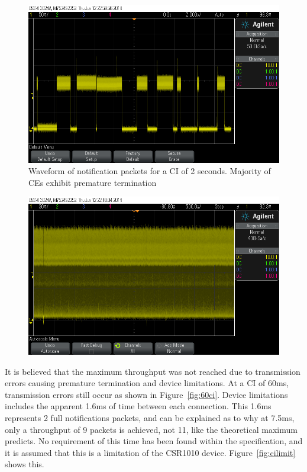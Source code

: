 \documentclass[]{article}
\begin{document}
\begin{figure}[H]
	\begin{center}
		\includegraphics[width = \textwidth]{2sec}
	\end{center}
	\caption{Waveform of notification packets for a \ac{CI} of 2 seconds. Majority of \ac{CE}s exhibit premature termination}
	\label{fig:2sec}
\end{figure}


\begin{figure}[H]
	\begin{center}
		\includegraphics[width = \textwidth]{lowcierrors}
	\end{center}
	\caption{}
	\label{fig:lowcierrors}
\end{figure}



It is believed that the maximum throughput was not reached due to transmission errors causing premature termination and device limitations. At a \ac{CI} of 60ms, transmission errors still occur as shown in Figure~\ref{fig:60ci}. Device limitations includes the apparent 1.6ms of time between each connection. This 1.6ms represents 2 full notifications packets, and can be explained as to why at 7.5ms, only a throughput of 9 packets is achieved, not 11, like the theoretical maximum predicts. No requirement of this time has been found within the specification, and it is assumed that this is a limitation of the CSR1010 device. Figure~\ref{fig:cilimit} shows this. 
\end{document}
